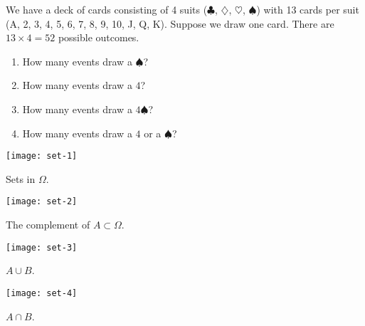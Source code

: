 \begin{exercisebox}
We have a deck of cards consisting of 4 suits ($\clubsuit$, $\diamondsuit$, $\heartsuit$, $\spadesuit$) with 13 cards per suit (A, 2, 3, 4, 5, 6, 7, 8, 9, 10, J, Q, K).  Suppose we draw one card.  There are $13\times 4=52$ possible outcomes.
\begin{enumerate}
\item How many events draw a $\spadesuit$?
\item How many events draw a $4$?
\item How many events draw a $4\spadesuit$?
\item How many events draw a $4$ or a $\spadesuit$?
\end{enumerate}
\label{ex.card-deck}
\end{exercisebox}

\begin{marginfigure}
\texttt{[image: set-1]}
\caption[Sets]{Sets in $\Omega$.}
\label{f.set-1}
\end{marginfigure}
\begin{marginfigure}
\texttt{[image: set-2]}
\caption[The complement of a set]{The complement of $A\subset\Omega$.}
\label{f.set-2}
\end{marginfigure}
\begin{marginfigure}
\texttt{[image: set-3]}
\caption[The union of two sets]{$A\cup B$.}
\label{f.set-3}
\end{marginfigure}
\begin{marginfigure}
\texttt{[image: set-4]}
\caption[The intersection of two sets]{$A\cap B$.}
\label{f.set-4}
\end{marginfigure}

